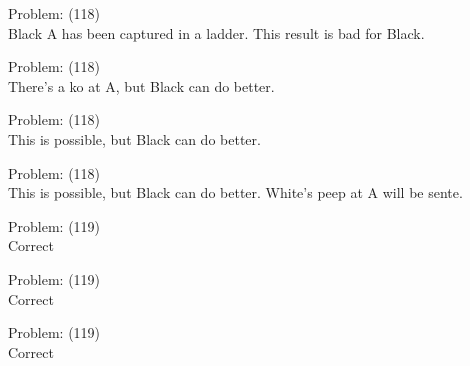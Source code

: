 \documentclass[11pt]{article}
\begin{document}
\begin{minipage}[t]{0.5\textwidth}
  {\centering
  
  Problem: (118)\\
  Black A has been captured in a ladder. This result is bad for Black.\\
  }
\end{minipage}
\begin{minipage}[t]{0.5\textwidth}
  {\centering
  
  Problem: (118)\\
  There's a ko at A, but Black can do better.\\
  }
\end{minipage}
\begin{minipage}[t]{0.5\textwidth}
  {\centering
  
  Problem: (118)\\
  This is possible, but Black can do better.\\
  }
\end{minipage}
\begin{minipage}[t]{0.5\textwidth}
  {\centering
  
  Problem: (118)\\
  This is possible, but Black can do better. White's peep at A will be sente.\\
  }
\end{minipage}
\begin{minipage}[t]{0.5\textwidth}
  {\centering
  
  Problem: (119)\\
  Correct\\
  }
\end{minipage}
\begin{minipage}[t]{0.5\textwidth}
  {\centering
  
  Problem: (119)\\
  Correct\\
  }
\end{minipage}
\begin{minipage}[t]{0.5\textwidth}
  {\centering
  
  Problem: (119)\\
  Correct\\
  }
\end{minipage}
\end{document}
